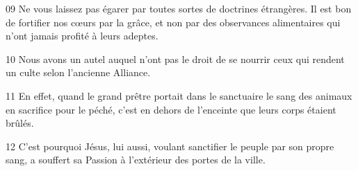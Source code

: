 
09 Ne vous laissez pas égarer par toutes sortes de doctrines étrangères. Il est bon de fortifier nos cœurs par la grâce, et non par des observances alimentaires qui n’ont jamais profité à leurs adeptes.

10 Nous avons un autel auquel n’ont pas le droit de se nourrir ceux qui rendent un culte selon l’ancienne Alliance.

11 En effet, quand le grand prêtre portait dans le sanctuaire le sang des animaux en sacrifice pour le péché, c’est en dehors de l’enceinte que leurs corps étaient brûlés.

12 C’est pourquoi Jésus, lui aussi, voulant sanctifier le peuple par son propre sang, a souffert sa Passion à l’extérieur des portes de la ville.